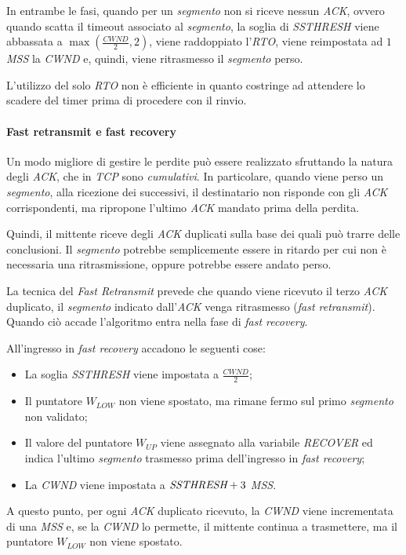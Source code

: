 \bigskip\noindent
In entrambe le fasi, quando per un \emph{segmento} non si riceve nessun
\emph{ACK}, ovvero quando scatta il timeout associato al \emph{segmento}, la
soglia di \emph{SSTHRESH} viene abbassata a $\max\left(\frac{CWND}{2}, 2\right)$,
viene raddoppiato l'\emph{RTO}, viene reimpostata ad $1$ \emph{MSS} la
\emph{CWND} e, quindi, viene ritrasmesso il \emph{segmento} perso.

\begin{note}
    L'utilizzo del solo \emph{RTO} non è efficiente in quanto costringe ad
    attendere lo scadere del timer prima di procedere con il rinvio.
\end{note}

\paragraph{Fast retransmit e fast recovery}
Un modo migliore di gestire le perdite può essere realizzato sfruttando la
natura degli \emph{ACK}, che in \emph{TCP} sono \emph{cumulativi}. In particolare,
quando viene perso un \emph{segmento}, alla ricezione dei successivi, il destinatario
non risponde con gli \emph{ACK} corrispondenti, ma ripropone l'ultimo \emph{ACK}
mandato prima della perdita.

Quindi, il mittente riceve degli \emph{ACK} duplicati sulla base dei quali può
trarre delle conclusioni. Il \emph{segmento} potrebbe semplicemente essere in
ritardo per cui non è necessaria una ritrasmissione, oppure potrebbe essere
andato perso.

La tecnica del \emph{Fast Retransmit} prevede che quando viene ricevuto il terzo
\emph{ACK} duplicato, il \emph{segmento} indicato dall'\emph{ACK} venga ritrasmesso
(\emph{fast retransmit}). Quando ciò accade l'algoritmo entra nella fase di
\emph{fast recovery}.

All'ingresso in \emph{fast recovery} accadono le seguenti cose:
\begin{itemize}
    \item La soglia \emph{SSTHRESH} viene impostata a $\frac{CWND}{2}$;
    \item Il puntatore $W_{LOW}$ non viene spostato, ma rimane fermo sul primo
    \emph{segmento} non validato;
    \item Il valore del puntatore $W_{UP}$ viene assegnato alla variabile
    \emph{RECOVER} ed indica l'ultimo \emph{segmento} trasmesso prima
    dell'ingresso in \emph{fast recovery};
    \item La \emph{CWND} viene impostata a $\emph{SSTHRESH}+3$ \emph{MSS}.
\end{itemize}
A questo punto, per ogni \emph{ACK} duplicato ricevuto, la \emph{CWND} viene
incrementata di una \emph{MSS} e, se la \emph{CWND} lo permette, il mittente
continua a trasmettere, ma il puntatore $W_{LOW}$ non viene spostato.

